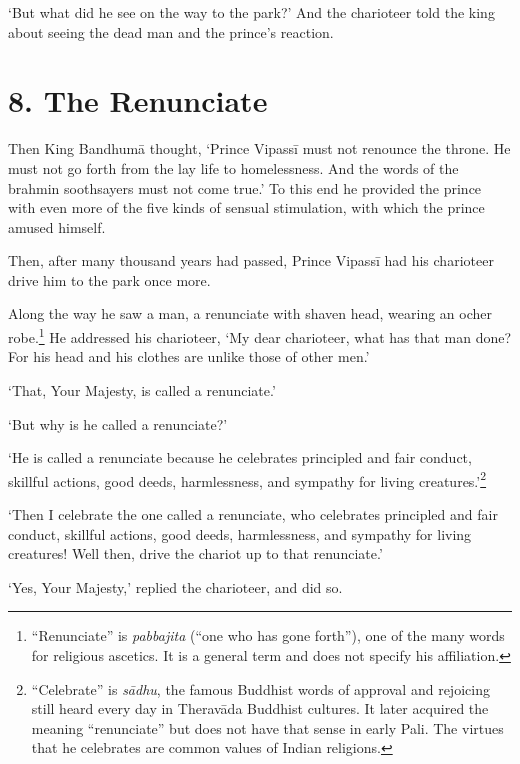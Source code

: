 \documentclass[12pt,openany]{book}%
\begin{document}
‘But what did he see on the way to the park?’ And the charioteer told the king about seeing the dead man and the prince’s reaction. 

\section*{8. The Renunciate }

Then King \textsanskrit{Bandhumā} thought, ‘Prince \textsanskrit{Vipassī} must not renounce the throne. He must not go forth from the lay life to homelessness. And the words of the brahmin soothsayers must not come true.’ To this end he provided the prince with even more of the five kinds of sensual stimulation, with which the prince amused himself. 

Then, after many thousand years had passed, Prince \textsanskrit{Vipassī} had his charioteer drive him to the park once more. 

Along the way he saw a man, a renunciate with shaven head, wearing an ocher robe.\footnote{“Renunciate” is \textit{pabbajita} (“one who has gone forth”), one of the many words for religious ascetics. It is a general term and does not specify his affiliation. } He addressed his charioteer, ‘My dear charioteer, what has that man done? For his head and his clothes are unlike those of other men.’ 

‘That, Your Majesty, is called a renunciate.’ 

‘But why is he called a renunciate?’ 

‘He is called a renunciate because he celebrates principled and fair conduct, skillful actions, good deeds, harmlessness, and sympathy for living creatures.’\footnote{“Celebrate” is \textit{\textsanskrit{sādhu}}, the famous Buddhist words of approval and rejoicing still heard every day in \textsanskrit{Theravāda} Buddhist cultures. It later acquired the meaning “renunciate” but does not have that sense in early Pali. The virtues that he celebrates are common values of Indian religions. } 

‘Then I celebrate the one called a renunciate, who celebrates principled and fair conduct, skillful actions, good deeds, harmlessness, and sympathy for living creatures! Well then, drive the chariot up to that renunciate.’ 

‘Yes, Your Majesty,’ replied the charioteer, and did so. 
\end{document}
